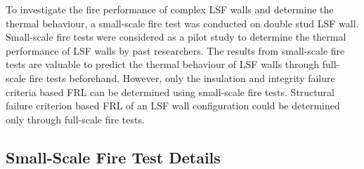 To investigate the fire performance of complex LSF walls and determine the thermal behaviour, a small-scale fire test was conducted on double stud LSF wall. Small-scale fire tests were considered as a pilot study to determine the thermal performance of LSF walls by past researchers. The results from small-scale fire tests are valuable to predict the thermal behaviour of LSF walls through full-scale fire tests beforehand. However, only the insulation and integrity failure criteria based FRL can be determined using small-scale fire tests. Structural failure criterion based FRL of an LSF wall configuration could be determined only through full-scale fire tests.

\subsection{Small-Scale Fire Test Details}

